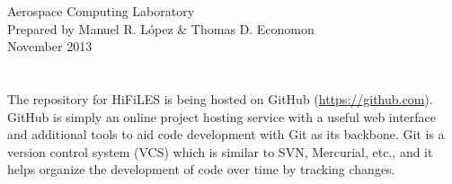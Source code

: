 \documentclass[letter,10pt]{article}
\title{\TitleFont{\vspace{-1cm}\bf{HiFiLES Quick Reference Guide \vspace{-2cm}}}}
\date{}
\newcommand*{\TitleFont}{%
      \usefont{\encodingdefault}{\rmdefault}{b}{n}%
      \fontsize{10}{20}%
      \selectfont}
\begin{document}
\begin{flushleft}
Aerospace Computing Laboratory\\
Prepared by Manuel R. L\'opez \& Thomas D. Economon\\
November 2013
\end{flushleft}

\begingroup
\let\newpage\relax%
\let\date\relax
\let\author\relax
\maketitle
\endgroup
{}

\section*{\TitleFont{Developing HiFiLES through Git + GitHub}}

The repository for HiFiLES is being hosted on GitHub (\url{https://github.com}). GitHub is simply an online project hosting service with a useful web interface and additional tools to aid code development with Git as its backbone. Git is a version control system (VCS) which is similar to SVN, Mercurial, etc., and it helps organize the development of code over time by tracking changes. 
\end{document}
